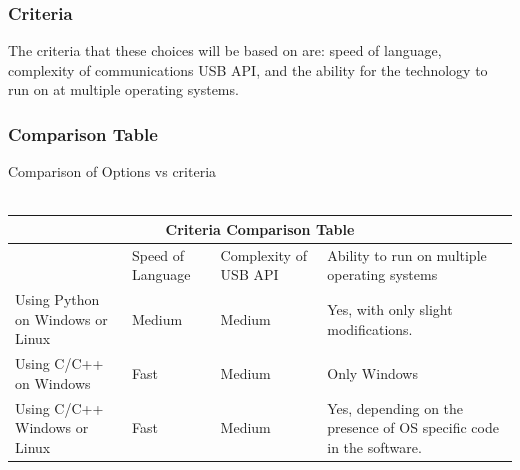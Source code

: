 \documentclass[10pt,draftclsnofoot,onecolumn,retainorgcmds]{IEEEtran}
\begin{document}
\subsubsection{Criteria}
The criteria that these choices will be based on are: speed of language, complexity of communications USB API, and the ability for the technology to run on at multiple operating systems.\\
\subsubsection{Comparison Table}
Comparison of Options vs criteria \\ \\
\begin{table}
\centering
\begin{tabular}{ |p{2cm}|p{2cm}|p{2cm}| p{2cm}| }
	\hline
	\multicolumn{4}{|c|}{Criteria Comparison Table} \\
	\hline
	&Speed of Language&Complexity of USB API&Ability to run on multiple operating systems\\
	\hline
	Using Python on Windows or Linux&Medium&Medium&Yes, with only slight modifications. \\
	\hline
	Using C/C++ on Windows&Fast&Medium&Only Windows \\
	\hline
	Using C/C++ Windows or Linux &Fast&Medium&Yes, depending on the presence of OS specific code in the software. \\
	\hline
\end{tabular}
\end{table}
\vspace{1cm}
\end{document}
